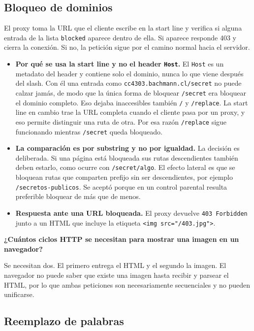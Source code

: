 \documentclass[11pt,a4paper]{article}
\begin{document}
\subsection{Bloqueo de dominios}

El proxy toma la URL que el cliente escribe en la start line y verifica si alguna entrada de la
lista \texttt{blocked} aparece dentro de ella. Si aparece responde 403 y cierra la conexión. Si no,
la petición sigue por el camino normal hacia el servidor.

\begin{itemize}
  \item \textbf{Por qué se usa la start line y no el header \texttt{Host}.} El \texttt{Host} es un
        metadato del header y contiene solo el dominio, nunca lo que viene después del slash. Con él
        una entrada como \texttt{cc4303.bachmann.cl/secret} no puede calzar jamás, de modo que la
        única forma de bloquear \texttt{/secret} era bloquear el dominio completo. Eso dejaba
        inaccesibles también \texttt{/} y \texttt{/replace}. La start line en cambio trae la URL
        completa cuando el cliente pasa por un proxy, y eso permite distinguir una ruta de otra.
        Por esa razón \texttt{/replace} sigue funcionando mientras \texttt{/secret} queda bloqueado.
  \item \textbf{La comparación es por substring y no por igualdad.} La decisión es deliberada. Si
        una página está bloqueada sus rutas descendientes también deben estarlo, como ocurre con
        \texttt{/secret/algo}. El efecto lateral es que se bloquean rutas que comparten prefijo sin
        ser descendientes, por ejemplo \texttt{/secretos-publicos}. Se aceptó porque en un control
        parental resulta preferible bloquear de más que de menos.
  \item \textbf{Respuesta ante una URL bloqueada.} El proxy devuelve \texttt{403 Forbidden} junto a
        un HTML que incluye la etiqueta \texttt{<img src="/403.jpg">}.
\end{itemize}

\noindent\textbf{¿Cuántos ciclos HTTP se necesitan para mostrar una imagen en un navegador?}

\medskip
\noindent Se necesitan dos. El primero entrega el HTML y el segundo la imagen. El navegador no puede
saber que existe una imagen hasta recibir y parsear el HTML, por lo que ambas peticiones son
necesariamente secuenciales y no pueden unificarse.

\subsection{Reemplazo de palabras}
\end{document}
